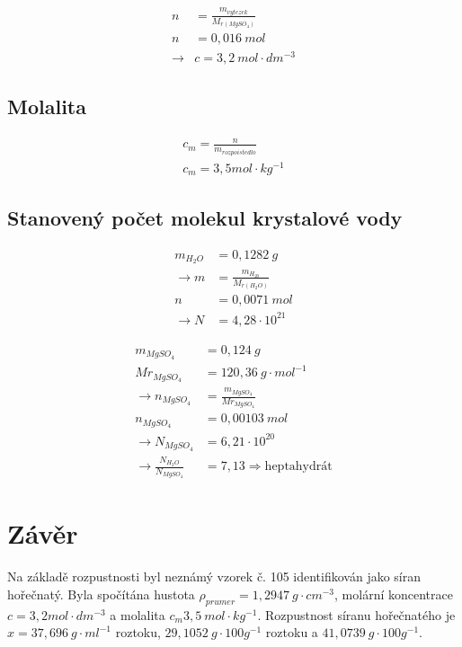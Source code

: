 \documentclass[13pt, a4paper, twoside]{article}
\begin{document}
\begin{align*}
    n&= \frac{m_{vytezek}}{M_{r(MgSO_4)}}\\
    n&= 0,016 \:mol\\
    \to &c=3,2 \: mol \cdot dm^{-3}
\end{align*}

\subsection*{Molalita}
\begin{align*}
    c_m = \frac{n}{m_{rozpoistedlo}}\\
    c_m = 3,5 mol \cdot kg^{-1}
\end{align*}

\subsection*{Stanovený počet molekul krystalové vody}
\begin{align*}
    m_{H_2O} &= 0,1282\: g\\
    \to m &= \frac{m_{H_20}}{M_{r(H_2O)}}\\
    n &= 0,0071\: mol \\
    \to N &= 4,28 \cdot 10^{21}
\end{align*}

\begin{align*}
    m_{MgSO_4} &= 0,124\: g \\
    Mr_{MgSO_4} &= 120,36 \: g\cdot mol^{-1}\\
    \to n_{MgSO_4} &= \frac{m_{MgSO_4}}{Mr_{MgSO_4}}\\
    n_{MgSO_4} &= 0,00103 \:mol\\
    \to N_{MgSO_4} &= 6,21 \cdot 10^{20}\\
    \to \frac{N_{H_2O}}{N_{MgSO_4}} &= 7,13 \Rightarrow  \text{heptahydrát}
\end{align*}

\section*{Závěr}
Na základě rozpustnosti byl neznámý vzorek č. 105 identifikován jako síran hořečnatý. Byla spočítána hustota
$\rho_{prumer}=1,2947 \: g \cdot cm^{-3}$, molární koncentrace $c=3,2 mol \cdot dm^{-3}$
a molalita $c_m3,5 \: mol \cdot kg^{-1}$. Rozpustnost síranu hořečnatého je
$x=37,696 \: g \cdot ml^{-1}$ roztoku, $29,1052\: g \cdot 100 g^{-1}$ roztoku
a $41,0739\: g \cdot 100g^{-1}$.
\end{document}
